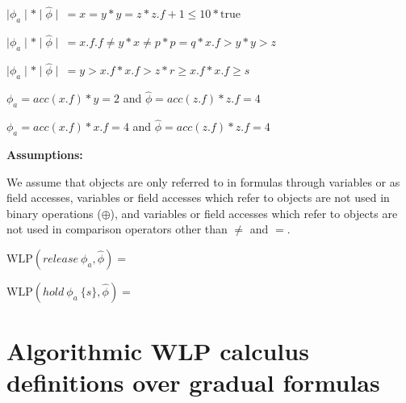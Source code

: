 \documentclass {article}
\newcommand{\lcar}{\left<}
\newcommand{\rcar}{\right>}
\newcommand{\true}{\text{true}}
\newcommand{\fphi}{\widehat{\phi}}
\newcommand{\wlp}[2]{\text{WLP}(#1,#2)}
\begin{document}
$\mid \phi_a \mid \ast \mid \fphi \mid \ = x = y \ast y = z \ast z.f + 1 \leq 10 \ast \true$

$\mid \phi_a \mid \ast \mid \fphi \mid \ = x.f.f \neq y \ast x \neq p \ast p = q \ast x.f > y \ast y > z$

$\mid \phi_a \mid \ast \mid \fphi \mid \ = y > x.f \ast x.f > z \ast r \geq x.f \ast x.f \geq s$

$\phi_a = acc(x.f) \ast y = 2$ and $\fphi = acc(z.f) \ast z.f = 4$

$\phi_a = acc(x.f) \ast x.f = 4$ and $\fphi = acc(z.f) \ast z.f = 4$

\textbf{Assumptions:}

We assume that objects are only referred to in formulas through variables or as field accesses, variables or field accesses which refer to objects are not used in binary operations ($\oplus$), and variables or field accesses which refer to objects are not used in comparison operators other than $\neq$ and $=$.

%	
%
%
%
%
%
%

\vspace{0.5cm}

$\wlp{release \ \phi_a}{\fphi} = $

\vspace{0.5cm}

$\wlp{hold \ \phi_a \ \{s\}}{\fphi} = $

\section{Algorithmic WLP calculus definitions over gradual formulas}
\hspace{0.5cm}
\end{document}
